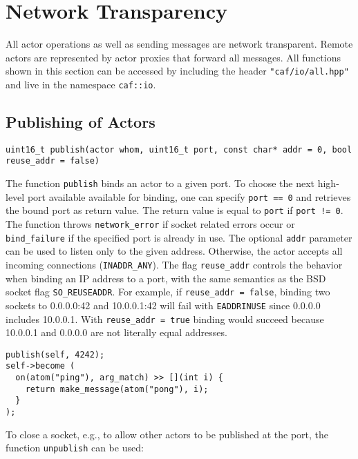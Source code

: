 \section{Network Transparency}

All actor operations as well as sending messages are network transparent.
Remote actors are represented by actor proxies that forward all messages.
All functions shown in this section can be accessed by including the header \lstinline^"caf/io/all.hpp"^ and live in the namespace \lstinline^caf::io^.

\subsection{Publishing of Actors}

\begin{lstlisting}
uint16_t publish(actor whom, uint16_t port, const char* addr = 0, bool reuse_addr = false)
\end{lstlisting}

The function \lstinline^publish^ binds an actor to a given port.
To choose the next high-level port available available for binding, one can specify \lstinline^port == 0^ and retrieves the bound port as return value.
The return value is equal to \lstinline^port^ if \lstinline^port != 0^.
The function throws \lstinline^network_error^ if socket related errors occur or \lstinline^bind_failure^ if the specified port is already in use.
The optional \lstinline^addr^ parameter can be used to listen only to the given address.
Otherwise, the actor accepts all incoming connections (\lstinline^INADDR_ANY^).
The flag \lstinline^reuse_addr^ controls the behavior when binding an IP
address to a port, with the same semantics as the BSD socket flag \lstinline^SO_REUSEADDR^.
For example, if \lstinline^reuse_addr = false^, binding two sockets to 0.0.0.0:42 and 10.0.0.1:42 will fail with \texttt{EADDRINUSE} since 0.0.0.0 includes 10.0.0.1. 
With \lstinline^reuse_addr = true^ binding would succeed because 10.0.0.1 and
0.0.0.0 are not literally equal addresses.


\begin{lstlisting}
publish(self, 4242);
self->become (
  on(atom("ping"), arg_match) >> [](int i) {
    return make_message(atom("pong"), i);
  }
);
\end{lstlisting}

To close a socket, e.g., to allow other actors to be published at the port, the function \lstinline^unpublish^ can be used:

